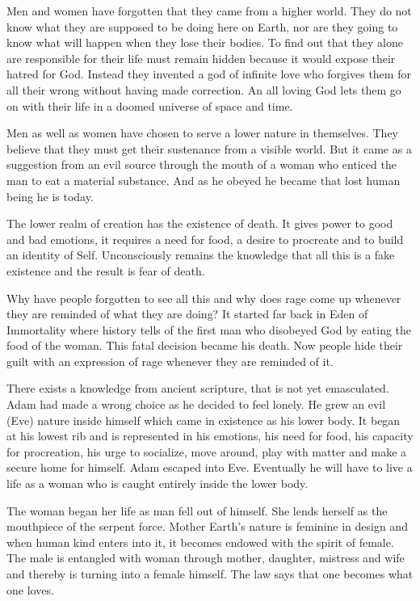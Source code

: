 \documentclass[12pt,letterpaper]{article}
\begin{document}
Men and women have forgotten that they came from a higher world. They
do not know what they are supposed to be doing here on Earth, nor are
they going to know what will happen when they lose their bodies. To
find out that they alone are responsible for their life must remain
hidden because it would expose their hatred for God. Instead they
invented a god of infinite love who forgives them for all their wrong
without having made correction. An all loving God lets them go on with
their life in a doomed universe of space and time.

Men as well as women have chosen to serve a lower nature in
themselves. They believe that they must get their sustenance from a
visible world. But it came as a suggestion from an evil source through
the mouth of a woman who enticed the man to eat a material
substance. And as he obeyed he became that lost human being he is
today.

The lower realm of creation has the existence of death. It gives power
to good and bad emotions, it requires a need for food, a desire to
procreate and to build an identity of Self. Unconsciously remains the
knowledge that all this is a fake existence and the result is fear of
death.

Why have people forgotten to see all this and why does rage come up
whenever they are reminded of what they are doing? It started far back
in Eden of Immortality where history tells of the first man who
disobeyed God by eating the food of the woman. This fatal decision
became his death. Now people hide their guilt with an expression of
rage whenever they are reminded of it.

There exists a knowledge from ancient scripture, that is not yet
emasculated.  Adam had made a wrong choice as he decided to feel
lonely. He grew an evil (Eve) nature inside himself which came in
existence as his lower body. It began at his lowest rib and is
represented in his emotions, his need for food, his capacity for
procreation, his urge to socialize, move around, play with matter and
make a secure home for himself. Adam escaped into Eve. Eventually he
will have to live a life as a woman who is caught entirely inside the
lower body.

The woman began her life as man fell out of himself. She lends herself
as the mouthpiece of the serpent force. Mother Earth's nature is feminine
in design and when human kind enters into it, it becomes endowed with
the spirit of female.  The male is entangled with woman through
mother, daughter, mistress and wife and thereby is turning into a
female himself. The law says that one becomes what one loves.
\end{document}
